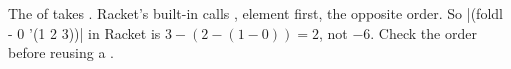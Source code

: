 \begin{pitfall}
The  of  takes . Racket's built-in  calls , element first, the opposite order. So \rkt|(foldl - 0 '(1 2 3))| in Racket is $3-(2-(1-0)) = 2$, not $-6$. Check the order before reusing a .
\end{pitfall}
